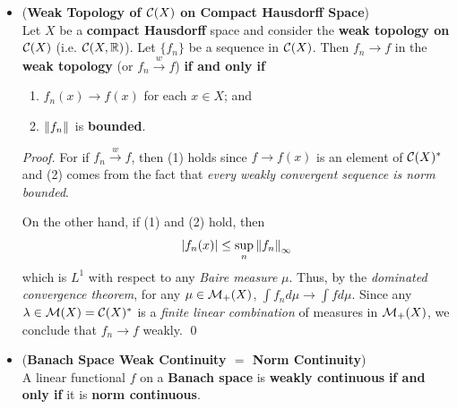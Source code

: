 \documentclass[11pt]{article}
\begin{document}
\begin{itemize}
\begin{proof}
On the other hand, let (1) and (2) hold and let $\cF \subset \cH$ be the subspace of \emph{finite linear combinations} of the $\varphi_{\alpha}$. By (1), 
$\inn{\psi_n}{\varphi_{\alpha}} \rightarrow \inn{\psi}{\varphi_{\alpha}}$ if $\varphi \in \cF$. Using the fact that $\cF$ is dense, (2), and an $\epsilon/3$ argument, the weak convergence follows. \qed
\end{proof}

\item \begin{proposition} (\textbf{Weak Topology of ${\mathcal C}(X)$ on Compact Hausdorff Space}) \citep{reed1980methods}\\
Let $X$ be a \textbf{compact Hausdorff} space and consider the \textbf{weak topology on} ${\mathcal C}(X)$ (i.e. ${\mathcal C}(X, {\mathbb R})$). Let $\{f_n\}$ be a sequence in ${\mathcal C}(X)$. Then $f_n \rightarrow f$  in the \textbf{weak topology} (or  $f_n \stackrel{w}{\rightarrow} f$) \textbf{if and only if}
\begin{enumerate}
\item $f_{n}(x) \rightarrow f(x)$ for each $x \in X$; and
\item $\left\|f_n\right\|_{}$ is \textbf{bounded}.
\end{enumerate}
\end{proposition}
\begin{proof}
For if  $f_n \stackrel{w}{\rightarrow} f$, then (1) holds since $f \rightarrow f(x)$ is an element of ${\mathcal C}(X)^{*}$ and (2) 
comes from  the fact that \emph{every weakly convergent sequence is norm bounded}.  

On the other hand, if (1) and (2) hold,  then 
\begin{align*}
\left\lvert f_n(x) \right\rvert \le \sup_{n}\left\|f_n\right\|_{\infty}
\end{align*}
which is $L^1$ with respect to any \emph{Baire measure} $\mu$. Thus, by the \emph{dominated convergence theorem}, for any $\mu \in {\mathcal M}_{+}(X)$, $\int f_n d\mu \rightarrow \int f d\mu$. Since any $\lambda \in {\mathcal M}(X) = {\mathcal C}(X)^{*}$ is a \emph{finite linear combination} of measures in ${\mathcal M}_{+}(X)$, we conclude that $f_n \rightarrow f$ weakly. \qed
\end{proof}


\item \begin{proposition} (\textbf{Banach Space Weak Continuity $=$ Norm Continuity}) \citep{reed1980methods}\\
A linear functional $f$ on a \textbf{Banach space} is \textbf{weakly continuous} \textbf{if and only if} it is \textbf{norm continuous}.
\end{proposition}

\end{itemize}
\end{document}
